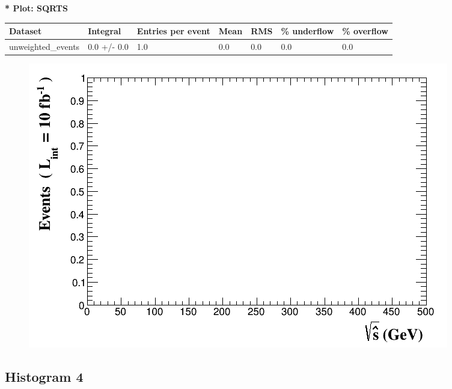 \documentclass[a4paper, 10pt]{article}
\begin{document}
\textbf{* Plot: SQRTS}\\
   \begin{table}[H]
  \begin{center}
    \begin{tabular}{|m{23.0mm}|m{23.0mm}|m{18.0mm}|m{19.0mm}|m{19.0mm}|m{19.0mm}|m{19.0mm}|}
      \hline
      {\cellcolor{yellow}         Dataset}& {\cellcolor{yellow}         Integral}& {\cellcolor{yellow}         Entries per event}& {\cellcolor{yellow}         Mean}& {\cellcolor{yellow}         RMS}& {\cellcolor{yellow}         \% underflow}& {\cellcolor{yellow}         \% overflow}\\
      \hline
      {\cellcolor{white}         unweighted\_events}& {\cellcolor{white}         0.0 +/\-- 0.0}& {\cellcolor{white}         1.0}& {\cellcolor{white}         0.0}& {\cellcolor{white}         0.0}& {\cellcolor{green}         0.0}& {\cellcolor{green}         0.0}\\
\hline
    \end{tabular}
  \end{center}
\end{table}

\begin{figure}[H]
  \begin{center}
    \includegraphics[scale=0.45]{selection_2.png}\\
\caption{   }
  \end{center}
\end{figure}
      \newpage
\subsection{ Histogram 4}
\end{document}

